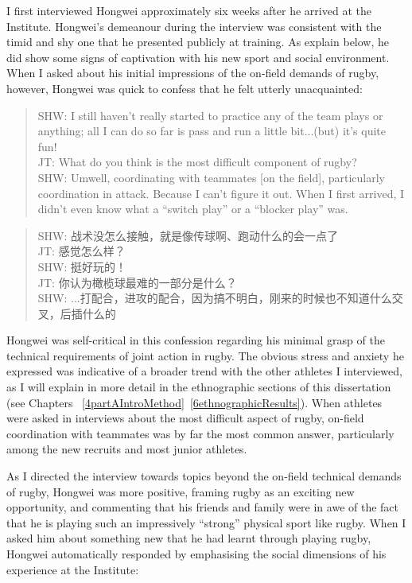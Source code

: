 \begin{CJK}{UTF8}{gbsn}
I first interviewed Hongwei approximately six weeks after he arrived at the Institute.   Hongwei's demeanour during the interview was consistent with the timid and shy one that he presented publicly at training.  As explain below, he did show some signs of captivation with his new sport and social environment.  When I asked about his initial impressions of the on-field demands of rugby, however, Hongwei was quick to confess that he felt utterly unacquainted:

\begin{quotation}
  SHW: I still haven’t really started to practice any of the team plays or anything; all I can do so far is pass and run a little bit...(but) it's quite fun! \\
  JT: What do you think is the most difficult component of rugby? \\
  SHW: Um\textellipsis well, coordinating with teammates [on the field], particularly coordination in attack.  Because I can't figure it out.  When I first arrived, I didn’t even know what a ``switch play'' or a ``blocker play'' was.
\end{quotation}

  \begin{quotation}
    SHW: 战术没怎么接触，就是像传球啊、跑动什么的会一点了 \\
    JT: 感觉怎么样？\\
    SHW: 挺好玩的！\\
    JT: 你认为橄榄球最难的一部分是什么？ \\
    SHW: ...打配合，进攻的配合，因为搞不明白，刚来的时候也不知道什么交叉，后插什么的 \\
  \end{quotation}

Hongwei was self-critical in this confession regarding his minimal grasp of the technical requirements of joint action in rugby.  The obvious stress and anxiety he expressed was indicative of a broader trend with the other athletes I interviewed, as I will explain in more detail in the ethnographic sections of this dissertation (see Chapters ~\ref{4partAIntroMethod}\nobreakdash~\ref{6ethnographicResults}). When athletes were asked in interviews about the most difficult aspect of rugby, on-field coordination with teammates was by far the most common answer, particularly among the new recruits and most junior athletes.

As I directed the interview towards topics beyond the on-field technical demands of rugby, Hongwei was more positive, framing rugby as an exciting new opportunity, and commenting that his friends and family were in awe of the fact that he is playing such an impressively ``strong'' physical sport like rugby.  When I asked him about something new that he had learnt through playing rugby, Hongwei automatically responded by emphasising the social dimensions of his experience at the Institute:


\end{CJK}
